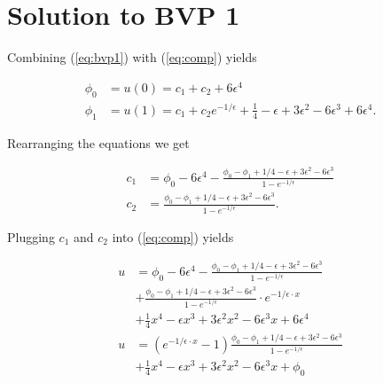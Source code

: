 \documentclass[a4paper, 12pt, reqno]{amsart}
\numberwithin{equation}{section}
\begin{document}
\section{Solution to BVP 1}

Combining (\ref{eq:bvp1}) with (\ref{eq:comp}) yields

\begin{equation}\nonumber
    \begin{aligned}
        \phi_0 &= u(0) = c_1 + c_2 + 6 \epsilon^4       \\
        \phi_1 &= u(1) = c_1 + c_2 e^{-1/\epsilon} + \frac{1}{4} - \epsilon 
            + 3 \epsilon^2 - 6 \epsilon^3 + 6 \epsilon^4.
    \end{aligned}
\end{equation}

Rearranging the equations we get

\begin{equation}\nonumber
    \begin{aligned}
        c_1 &= \phi_0 - 6 \epsilon^4 - \frac{\phi_0 - \phi_1 + 1/4 - \epsilon 
            + 3 \epsilon^2 - 6 \epsilon^3}{1 - e^{-1/\epsilon}}     \\
        c_2 &= \frac{\phi_0 - \phi_1 + 1/4 - \epsilon + 3 \epsilon^2 
            - 6 \epsilon^3}{1 - e^{-1/\epsilon}}.
    \end{aligned}
\end{equation}

Plugging $c_1$ and $c_2$ into (\ref{eq:comp}) yields

\begin{equation}\nonumber
    \begin{aligned}
    u &= \phi_0 - 6 \epsilon^4 - \frac{\phi_0 - \phi_1 + 1/4 - \epsilon 
            + 3 \epsilon^2 - 6 \epsilon^3}{1 - e^{-1/\epsilon}}     \\
        &+ \frac{\phi_0 - \phi_1 + 1/4 - \epsilon + 3 \epsilon^2 
            - 6 \epsilon^3}{1 - e^{-1/\epsilon}} \cdot e^{-1/\epsilon \cdot x}\\
        &+ \frac{1}{4}x^4 - \epsilon x^3 + 3\epsilon^2 x^2 
        - 6 \epsilon^3 x + 6 \epsilon^4                     \\
        u &= (e^{-1/\epsilon\cdot x} - 1) 
            \frac{\phi_0 - \phi_1 + 1/4 - \epsilon+3 \epsilon^2
            - 6 \epsilon^3} {1 - e^{-1/\epsilon}}\\
         &+ \frac{1}{4}x^4-\epsilon x^3+3\epsilon^2 x^2-6\epsilon^3 x+\phi_0
    \end{aligned}
\end{equation}
\end{document}
